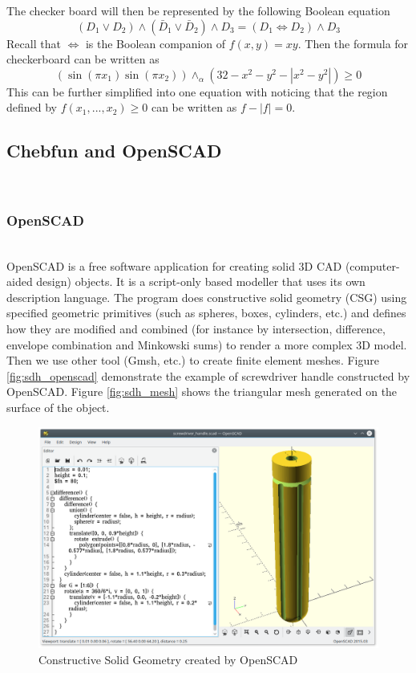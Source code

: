 \documentclass[11pt]{amsart}
\theoremstyle{definition}
\begin{document}
The checker board will then be represented by the following Boolean equation
$$(D_1\vee D_2)\wedge (\bar{D}_1\vee \bar{D}_2)\wedge D_3=(D_1\Leftrightarrow D_2)\wedge D_3$$
Recall that $\Leftrightarrow$ is the Boolean companion of $f(x,y)=xy$. Then the formula for checkerboard can be written as 
$$(\sin(\pi x_1)\sin(\pi x_2)) \wedge_\alpha (32-x^2-y^2-|x^2-y^2|) \geq 0$$
This can be further simplified into one equation with noticing that the region defined by $f(x_1,...,x_2)\geq 0$ can be written as $f-|f|= 0$.  


\subsection{Chebfun and OpenSCAD}~\\
\subsubsection{OpenSCAD}~\\
OpenSCAD is a free software application for creating solid 3D CAD (computer-aided design) objects. It is a script-only based modeller that uses its own description language. The program does constructive solid geometry (CSG) using specified geometric primitives (such as spheres, boxes, cylinders, etc.) and defines how they are modified and combined (for instance by intersection, difference, envelope combination and Minkowski sums) to render a more complex 3D model. Then we use other tool (Gmsh, etc.) to create finite element meshes. Figure \eqref{fig:sdh_openscad} demonstrate the example of screwdriver handle constructed by OpenSCAD. Figure \eqref{fig:sdh_mesh} shows the triangular mesh generated on the surface of the object.
\begin{figure}     	\centerline{\includegraphics[width=4.8in]{./figs/sdh_openscad}}
     	\hspace{-6pt}
		\caption{Constructive Solid Geometry created by OpenSCAD}
        \label{fig:sdh_openscad}
\end{figure}
\end{document}
